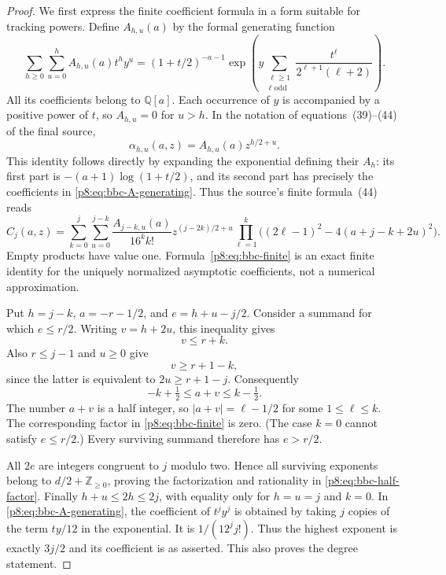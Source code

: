 \documentclass[11pt,a4paper]{article}
\theoremstyle{definition}
\theoremstyle{remark}
\numberwithin{equation}{section}
\begin{document}
\begin{proof}
We first express the finite coefficient formula in a form suitable for
tracking powers.  Define $A_{h,u}(a)$ by the formal generating function
\begin{equation}\label{p8:eq:bbc-A-generating}
 \sum_{h\geq0}\sum_{u=0}^h A_{h,u}(a)t^h y^u
 =(1+t/2)^{-a-1}
 \exp\!\left(
 y\sum_{\substack{\ell\geq1\\\ell\text{ odd}}}
 \frac{t^\ell}{2^{\ell+1}(\ell+2)}\right).
\end{equation}
All its coefficients belong to $\mathbb Q[a]$.
Each occurrence of $y$ is accompanied by a positive power of $t$,
so $A_{h,u}=0$ for $u>h$.
In the notation of equations~(39)--(44) of the final source,
\[
 \alpha_{h,u}(a,z)=A_{h,u}(a)z^{h/2+u}.
\]
This identity follows directly by expanding the exponential defining
their $A_h$: its first part is $-(a+1)\log(1+t/2)$,
and its second part has precisely the coefficients in
\eqref{p8:eq:bbc-A-generating}.  Thus the source's finite formula~(44) reads
\begin{equation}\label{p8:eq:bbc-finite}
 C_j(a,z)=\sum_{k=0}^j\sum_{u=0}^{j-k}
 \frac{A_{j-k,u}(a)}{16^k k!}
 z^{(j-2k)/2+u}
 \prod_{\ell=1}^k
 \bigl((2\ell-1)^2-4(a+j-k+2u)^2\bigr).
\end{equation}
Empty products have value one.  Formula~\eqref{p8:eq:bbc-finite}
is an exact finite identity for the uniquely normalized asymptotic
coefficients, not a numerical approximation.

Put $h=j-k$, $a=-r-1/2$, and $e=h+u-j/2$.
Consider a summand for which $e\leq r/2$.
Writing $v=h+2u$, this inequality gives
\[
 v\leq r+k.
\]
Also $r\leq j-1$ and $u\geq0$ give
\[
 v\geq r+1-k,
\]
since the latter is equivalent to $2u\geq r+1-j$.
Consequently
\[
 -k+\tfrac12\leq a+v\leq k-\tfrac12.
\]
The number $a+v$ is a half integer, so
$|a+v|=\ell-1/2$ for some $1\leq\ell\leq k$.
The corresponding factor in \eqref{p8:eq:bbc-finite} is zero.
(The case $k=0$ cannot satisfy $e\leq r/2$.)
Every surviving summand therefore has $e>r/2$.

All $2e$ are integers congruent to $j$ modulo two.  Hence all
surviving exponents belong to $d/2+\mathbb Z_{\geq0}$, proving
the factorization and rationality in \eqref{p8:eq:bbc-half-factor}.
Finally $h+u\leq2h\leq2j$, with equality only for
$h=u=j$ and $k=0$.  In \eqref{p8:eq:bbc-A-generating},
the coefficient of $t^j y^j$ is obtained by taking $j$ copies of
the term $ty/12$ in the exponential.  It is $1/(12^j j!)$.
Thus the highest exponent is exactly $3j/2$ and its coefficient
is as asserted.  This also proves the degree statement.
\end{proof}
\end{document}
